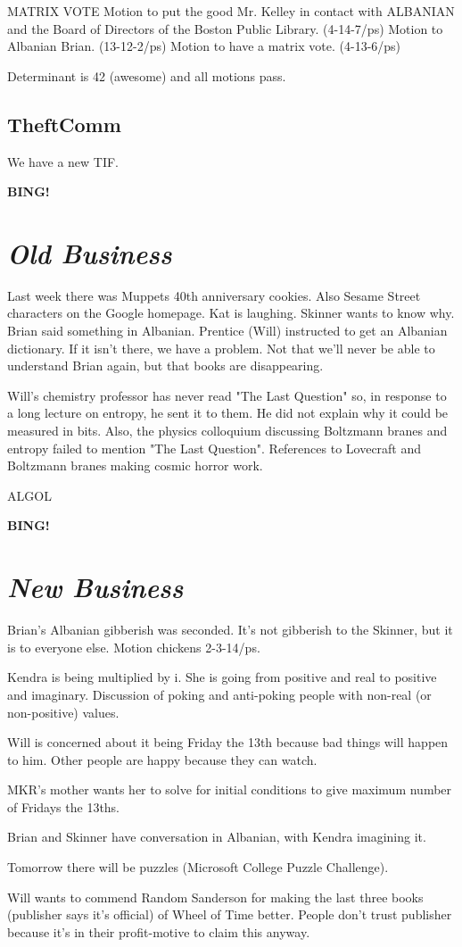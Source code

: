 \documentclass[10pt]{article}
\newcommand{\bing}{{\bf BING!} }
\newcommand{\goto}[1]{\bing \vskip 12pt \section*{{\em{#1}}}}
\begin{document}
MATRIX VOTE
Motion to put the good Mr. Kelley in contact with ALBANIAN and the Board of
Directors of the Boston Public Library. (4-14-7/ps)
Motion to Albanian Brian. (13-12-2/ps)
Motion to have a matrix vote. (4-13-6/ps)

Determinant is 42 (awesome) and all motions pass.

\subsection{TheftComm}
We have a new TIF.

\goto{Old Business}

Last week there was Muppets 40th anniversary cookies.  Also Sesame Street characters
on the Google homepage.  Kat is laughing.  Skinner wants to know why.  Brian said
something in Albanian.  Prentice (Will) instructed to get an Albanian dictionary.
If it isn't there, we have a problem.  Not that we'll never be able to understand
Brian again, but that books are disappearing.

Will's chemistry professor has never read "The Last Question" so, in response to a
long lecture on entropy, he sent it to them.  He did not explain why it could
be measured in bits.  Also, the physics colloquium discussing Boltzmann branes and
entropy failed to mention "The Last Question".  References to Lovecraft and
Boltzmann branes making cosmic horror work.

ALGOL

\goto{New Business}

Brian's Albanian gibberish was seconded.  It's not gibberish to the Skinner, but it
is to everyone else.  Motion chickens 2-3-14/ps.

Kendra is being multiplied by i.  She is going from positive and real to positive
and imaginary.  Discussion of poking and anti-poking people with non-real 
(or non-positive) values.

Will is concerned about it being Friday the 13th because bad things will happen
to him.  Other people are happy because they can watch.

MKR's mother wants her to solve for initial conditions to give maximum number of
Fridays the 13ths.

Brian and Skinner have conversation in Albanian, with Kendra imagining it.

Tomorrow there will be puzzles (Microsoft College Puzzle Challenge).

Will wants to commend Random Sanderson for making the last three books (publisher says
it's official) of Wheel of Time better.  People don't trust publisher because
it's in their profit-motive to claim this anyway.
\end{document}
